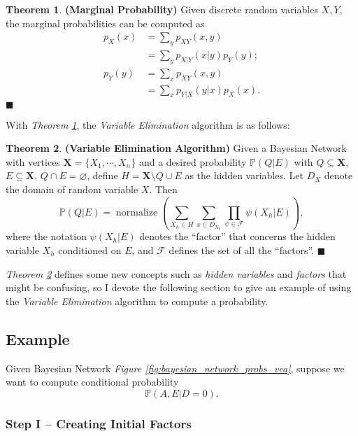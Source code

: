 \documentclass{article}
\theoremstyle{definition}
\newtheorem{theorem}{Theorem}
\newenvironment{theoremqed}
    {\begin{theorem}}
    {\hfill \qedsymbol \end{theorem}}
\renewcommand{\qedsymbol}{\(\blacksquare\)}
\newcommand{\X}{\mathbf{X}}
\renewcommand{\P}{\mathbb{P}}
\begin{document}
\begin{theoremqed} \label{thm:marginal}
    \textbf{(Marginal Probability)} Given discrete random variables \(X, Y\), the marginal probabilities can be computed as
    \begin{align*}
        p_X(x) &= \sum_y p_{XY}(x, y) \\
        &= \sum_y p_{X|Y}(x|y) p_Y(y); \\
        p_Y(y) &= \sum_x p_{XY}(x, y) \\
        &= \sum_x p_{Y|X}(y|x) p_X(x).
    \end{align*}
\end{theoremqed}

With \textit{Theorem \ref{thm:marginal}}, the \textit{Variable Elimination} algorithm is as follows:

\begin{theoremqed} \label{thm:vea}
    \textbf{(Variable Elimination Algorithm)} Given a Bayesian Network with vertices \(\X = \{X_1, \cdots, X_n\}\) and a desired probability \(\P(Q | E)\) with \(Q \subseteq \X\), \(E \subseteq \X\), \(Q \cap E = \varnothing\), define \(H = \X \setminus Q \cup E\) as the hidden variables. Let \(D_X\) denote the domain of random variable \(X\). Then
    \[\P(Q | E) = \operatorname{normalize}\left(\sum_{X_h \in H} \sum_{x\in D_{X_h}} \prod_{\psi \in \mathcal{F}} \psi(X_h|E) \right),\]
    where the notation \(\psi(X_h|E)\) denotes the ``factor'' that concerns the hidden variable \(X_h\) conditioned on \(E\), and \(\mathcal{F}\) defines the set of all the ``factors''.
\end{theoremqed}

\textit{Theorem \ref{thm:vea}} defines some new concepts such as \textit{hidden variables} and \textit{factors} that might be confusing, so I devote the following section to give an example of using the \textit{Variable Elimination} algorithm to compute a probability.

\subsection{Example}

Given Bayesian Network \textit{Figure \ref{fig:bayesian_network_probs_vea}}, suppose we want to compute conditional probability
\[\P(A, E | D = 0).\]

\subsubsection{Step I -- Creating Initial Factors}
\end{document}
